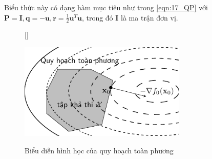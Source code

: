 Biểu thức này có dạng hàm mục tiêu như trong \eqref{eqn:17_QP} với $\mathbf{P = I}, \mathbf{q} = - \mathbf{u}, \mathbf{r} = \frac{1}{2} \mathbf{u}^T\mathbf{u}$, trong đó $\mathbf{I}$ là ma trận đơn vị. 

\begin{figure}[t]
    [\FBwidth]
    {\caption{Biểu diễn hình học của quy hoạch toàn phương}
    \label{fig:17_qp}}
    {\includegraphics[width=8cm]{Chapters/08_ConvexOptimization/17_convexopt/latex/qp.pdf}}
\end{figure}
 
